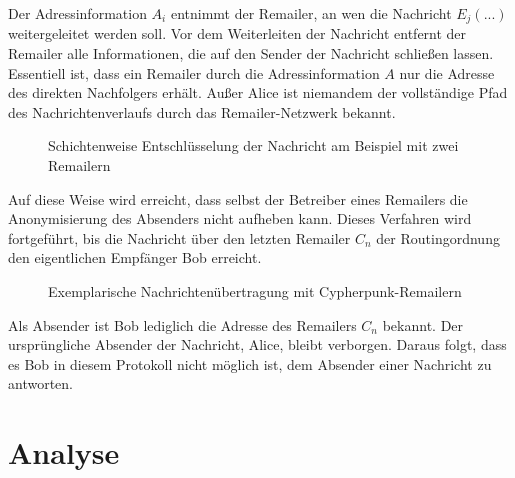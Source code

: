 Der Adressinformation \(A_i\) entnimmt der Remailer, an wen die Nachricht \(E_j(...)\) weitergeleitet werden soll. Vor dem Weiterleiten der Nachricht entfernt der Remailer alle Informationen, die auf den Sender der Nachricht schließen lassen. Essentiell ist, dass ein Remailer durch die Adressinformation \(A\) nur die Adresse des direkten Nachfolgers erhält. Außer Alice ist niemandem der vollständige Pfad des Nachrichtenverlaufs durch das Remailer-Netzwerk bekannt.

\begin{figure}
	\centering

	\caption{Schichtenweise Entschlüsselung der Nachricht am Beispiel mit zwei Remailern}
\end{figure}

Auf diese Weise wird erreicht, dass selbst der Betreiber eines Remailers die Anonymisierung des Absenders nicht aufheben kann. Dieses Verfahren wird fortgeführt, bis die Nachricht über den letzten Remailer \(C_n\) der Routingordnung den eigentlichen Empfänger Bob erreicht\cite[S. 72ff.]{kubieziel2007anonym}.

\begin{figure}
	\begin{center}
		\def\svgwidth{0.8 \linewidth}
		
		\caption{Exemplarische Nachrichtenübertragung mit Cypherpunk-Remailern}
	\end{center}
\end{figure}

Als Absender ist Bob lediglich die Adresse des Remailers \(C_n\) bekannt. Der ursprüngliche Absender der Nachricht, Alice, bleibt verborgen. Daraus folgt, dass es Bob in diesem Protokoll nicht möglich ist, dem Absender einer Nachricht zu antworten.

\section{Analyse}
